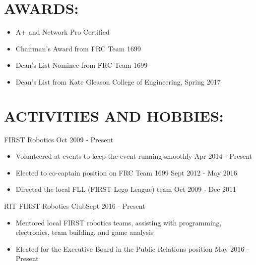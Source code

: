 \documentclass[line,margin]{res}
\begin{document}
\begin{resume}
%

\section{AWARDS:}
	\begin{itemize}
		\setlength{\itemindent}{-15pt}
		\item A+ and Network Pro Certified
		\item Chairman's Award from FRC Team 1699
		\item Dean's List Nominee from FRC Team 1699
		\item Dean's List from Kate Gleason College of Engineering, Spring 2017
	\end{itemize}


\section{ACTIVITIES AND HOBBIES:}

	FIRST Robotics \hfill Oct 2009 - Present
	\begin{itemize}
		\item Volunteered at events to keep the event running smoothly \hfill Apr 2014 - Present
		\item Elected to co-captain position on FRC Team 1699 \hfill Sept 2012 - May 2016
		\item Directed the local FLL (FIRST Lego League) team \hfill Oct 2009 - Dec 2011
	\end{itemize}

	RIT FIRST Robotics Club\hfill Sept 2016 - Present
	\begin{itemize}
		\item Mentored local FIRST robotics teams, assisting with programming, electronics, team building, and game analysis
		\item Elected for the Executive Board in the Public Relations position \hfill May 2016 - Present
	\end{itemize}


\end{resume}
\end{document}
